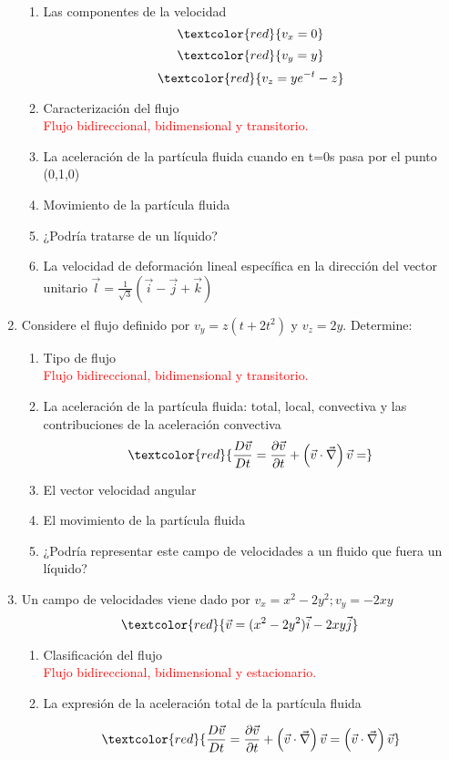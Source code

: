 \begin{enumerate}
\begin{enumerate}
		\item Las componentes de la velocidad 
		\[\textcolor{red}{v_x=0} \]
		\[	\textcolor{red}{ v_y=y}\] 
			\[\textcolor{red}{ v_z=ye^{-t} -z}\]
		\item Caracterización del flujo\\
		\textcolor{red}{Flujo bidireccional, bidimensional y transitorio.}
		\item La aceleración de la partícula fluida cuando en t=0s pasa por el punto (0,1,0)
		\item Movimiento de la partícula fluida
		\item ¿Podría tratarse de un líquido?
		\item La velocidad de deformación lineal específica en la dirección del vector unitario $\vec{l}=\frac{1}{\sqrt{3}}\left(\vec{i}-\vec{j}+\vec{k}\right)$
	\end{enumerate}
	\item Considere el flujo definido por $v_y=z\left(t+2t^2\right)$ y $v_z=2y$. Determine:
	\begin{enumerate}
		\item Tipo de flujo\\
		\textcolor{red}{Flujo bidireccional, bidimensional y transitorio.}
		\item La aceleración de la partícula fluida: total, local, convectiva y las contribuciones de la aceleración convectiva
		\[	\textcolor{red}{\frac{D\vec{v}}{Dt}=\frac{\partial\vec{v}}{\partial t}+\left(\vec{v}\cdot\vec{\nabla}\right)\vec{v}=}\]
		\item  El vector velocidad angular
		\item El movimiento de la partícula fluida
		\item ¿Podría representar este campo de velocidades a un fluido que fuera un líquido?
	\end{enumerate}
	
	\item Un campo de velocidades viene dado por $v_x=x^2-2y^2; v_y=-2xy$
	\[\textcolor{red}{\vec{v}=(x^2-2y^2)\vec{i}-2xy\vec{j}}\]
	\begin{enumerate}
		\item Clasificación del flujo\\
		\textcolor{red}{Flujo bidireccional, bidimensional y estacionario.}
		\item La expresión de la aceleración total de la partícula fluida
	
		\[	\textcolor{red}{\frac{D\vec{v}}{Dt}=\frac{\partial\vec{v}}{\partial t}+\left(\vec{v}\cdot\vec{\nabla}\right)\vec{v}=\left(\vec{v}\cdot\vec{\nabla}\right)\vec{v}}\]
		

\end{enumerate}
\end{enumerate}
